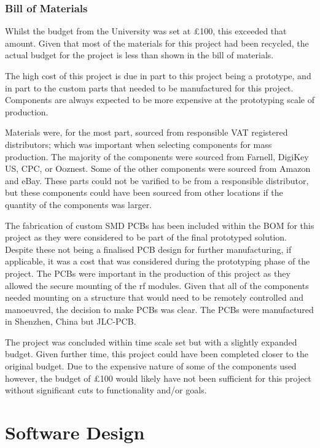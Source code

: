 \documentclass [11pt]{article}
\begin{document}
\subsubsection{Bill of Materials}

Whilst the budget from the University was set at £100, this exceeded that amount. Given that most of the materials for this project had been recycled, the actual budget for the project is less than shown in the bill of materials.

The high cost of this project is due in part to this project being a prototype, and in part to the custom parts that needed to be manufactured for this project. Components are always expected to be more expensive at the prototyping scale of production.

Materials were, for the most part, sourced from responsible VAT registered distributors; which was important when selecting components for mass production. The majority of the components were sourced from Farnell, DigiKey US, CPC, or Ooznest. Some of the other components were sourced from Amazon and eBay. These parts could not be varified to be from a responsible distributor, but these components could have been sourced from other locations if the quantity of the components was larger. 

The fabrication of custom SMD PCBs has been included within the BOM for this project as they were considered to be part of the final prototyped solution. Despite these not being a finalised PCB design for further manufacturing, if applicable, it was a cost that was considered during the prototyping phase of the project. The PCBs were important in the production of this project as they allowed the secure mounting of the \gls{rf} modules. Given that all of the components needed mounting on a structure that would need to be remotely controlled and manoeuvred, the decision to make PCBs was clear. The PCBs were manufactured in Shenzhen, China but JLC-PCB.

The project was concluded within time scale set but with a slightly expanded budget. Given further time, this project could have been completed closer to the original budget. Due to the expensive nature of some of the components used however, the budget of £100 would likely have not been sufficient for this project without significant cuts to functionality and/or goals.


\section{Software Design}
\end{document}
